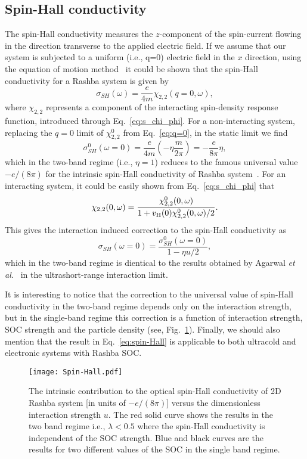 \documentclass[aps, pra, reprint,superscriptaddress]{revtex4-1}
\def\be{\begin{equation}}
\def\ee{\end{equation}}
\begin{document}
\subsection{Spin-Hall conductivity}
The spin-Hall conductivity measures the $z$-component of the spin-current flowing in the direction transverse to the applied electric field. If we assume that our system is subjected to a uniform (i.e., q=0) electric field in the $x$ direction, using the equation of motion method~\cite{Amit2011} it could be shown that the spin-Hall conductivity for a Rashba system is given by
\be\label{Optical-Hall}
\sigma_{SH}(\omega)=\frac{e}{4m }\chi_{2,2}(q=0,\omega),
\ee
where $\chi_{2,2}$ represents a component of the interacting spin-density response function, introduced through Eq.~\eqref{eq:s_chi_phi}. 
For a non-interacting system, replacing the $q=0$ limit of $\chi^0_{2,2}$ from Eq.~\eqref{eq:q=0}, in the static limit we find
\be\label{non-interacting-optical-Hall}
\sigma^{0}_{SH}(\omega=0)=\frac{e}{4m}(-\eta\frac{m}{2\pi})=-\frac{e}{8\pi} \eta,
\ee
which in the two-band regime (i.e., $\eta=1$) reduces to the famous universal value $-e/(8\pi)$ for the intrinsic spin-Hall conductivity of Rashba system~\cite{JSinova2004}.
For an interacting system, it could be easily shown from Eq.~\eqref{eq:s_chi_phi} that 
\be\label{Interacting-chi22}
\chi_{2,2}(0,\omega)=\frac{\chi^{0}_{2,2}(0,\omega)}{1+v_{\rm H}(0)\chi^{0}_{2,2}(0,\omega)/2}.
\ee
This gives the interaction induced correction to the spin-Hall conductivity as
\be\label{eq:spin-Hall} 
\sigma_{SH}(\omega=0)=\frac{\sigma^{0}_{SH}(\omega=0)}{1-\eta u/2}, 
\ee 
which in the two-band regime is dientical to the results obtained by Agarwal \textit{et al.}~\cite{Amit2011} in the ultrashort-range interaction limit. 

It is interesting to notice that the correction to the universal value of spin-Hall conductivity in the two-band regime depends only on the interaction strength, but in the single-band regime this correction is a function of interaction strength, SOC strength and the particle density (see, Fig.~\ref{fig:Spin-Hall}).
Finally, we should also mention that the result in Eq.~\eqref{eq:spin-Hall} is applicable to both ultracold and electronic systems with Rashba SOC.

\begin{figure}
\centering
\texttt{[image: Spin-Hall.pdf]}
\caption{The intrinsic contribution to the optical spin-Hall conductivity of 2D Rashba system [in units of $-e/(8\pi)$] versus the dimensionless interaction strength $u$. 
The red solid curve shows the results in the two band regime i.e., $\lambda<0.5$ where the spin-Hall conductivity is independent of the SOC strength. Blue and black curves are the results for two different values of the SOC in the single band regime.}
\label{fig:Spin-Hall}
\end{figure} 
\end{document}
